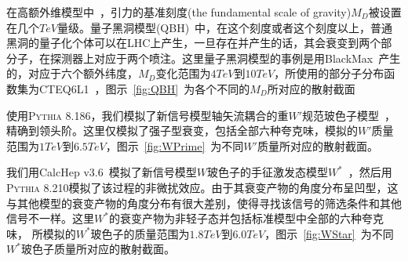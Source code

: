 在高额外维模型中~\cite{ADD}，引力的基准刻度(the fundamental scale of gravity)$M_{D}$被设置在几个$TeV$量级。量子黑洞模型(QBH)~\cite{qbh1,qbh2}中，在这个刻度或者这个刻度以上，普通黑洞的量子化个体可以在LHC上产生，一旦存在并产生的话，其会衰变到两个部分子，在探测器上对应于两个喷注。这里量子黑洞模型的事例是用BlackMax~\cite{Dai:BlackMax}产生的，对应于六个额外纬度，$M_{D}$变化范围为$4TeV$到$10TeV$，所使用的部分子分布函数集为CTEQ6L1~\cite{Pumplin:2002vw}，图示~\ref{fig:QBH}~为各个不同的$M_{D}$所对应的散射截面

使用\textsc{Pythia 8.186}，我们模拟了新信号模型轴矢流耦合的重$W\prime$规范玻色子模型~\cite{wprime1}，精确到领头阶。这里仅模拟了强子型衰变，包括全部六种夸克味，模拟的$W\prime$质量范围为$1TeV$到$6.5TeV$，图示~\ref{fig:WPrime}~为不同$W\prime$质量所对应的散射截面。

我们用CalcHep v3.6~\cite{CalcHEP}模拟了新信号模型$W$玻色子的手征激发态模型$W^*$~\cite{Chizhov:2009fc,Chizhov:2010jg}，然后用\textsc{Pythia 8.210}模拟了该过程的非微扰效应。由于其衰变产物的角度分布呈凹型，这与其他模型的衰变产物的角度分布有很大差别，使得寻找该信号的筛选条件和其他信号不一样。这里$W^*$的衰变产物为非轻子态并包括标准模型中全部的六种夸克味， 所模拟的$W^*$玻色子的质量范围为$1.8TeV$到$6.0TeV$，图示~\ref{fig:WStar}~为不同$W^*$玻色子质量所对应的散射截面。

